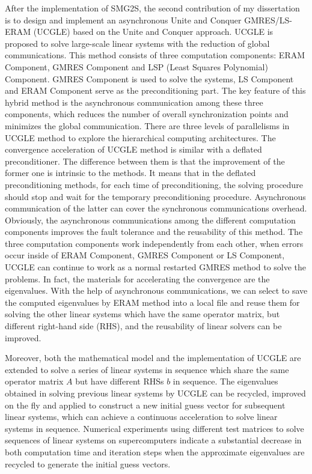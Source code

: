 After the implementation of SMG2S, the second contribution of my dissertation is to design and implement an asynchronous Unite and Conquer GMRES/LS-ERAM (UCGLE) based on the Unite and Conquer approach. UCGLE is proposed to solve large-scale linear systems with the reduction of global communications. This method consists of three computation components: ERAM Component, GMRES Component and LSP (Least Squares Polynomial) Component. GMRES Component is used to solve the systems, LS Component and ERAM Component serve as the preconditioning part. The key feature of this hybrid method is the asynchronous communication among these three components, which reduces the number of overall synchronization points and minimizes the global communication. There are three levels of parallelisms in UCGLE method to explore the hierarchical computing architectures. The convergence acceleration of UCGLE method is similar with a deflated preconditioner. The difference between them is that the improvement of the former one is intrinsic to the methods. It means that in the deflated preconditioning methods, for each time of preconditioning, the solving procedure should stop and wait for the temporary preconditioning procedure. Asynchronous communication of the latter can cover the synchronous communications overhead. Obviously, the asynchronous communications among the different computation components improves the fault tolerance and the reusability of this method. The three computation components work independently from each other, when errors occur inside of ERAM Component, GMRES Component or LS Component, UCGLE can continue to work as a normal restarted GMRES method to solve the problems. In fact, the materials for accelerating the convergence are the eigenvalues. With the help of asynchronous communications, we can select to save the computed eigenvalues by ERAM method into a local file and reuse them for solving the other linear systems which have the same operator matrix, but different right-hand side (RHS), and the reusability of linear solvers can be improved.

Moreover, both the mathematical model and the implementation of UCGLE are extended to solve a series of linear systems in sequence which share the same operator matrix $A$ but have different RHSs $b$ in sequence. The eigenvalues obtained in solving previous linear systems by UCGLE can be recycled, improved on the fly and applied to construct a new initial guess vector for subsequent linear systems, which can achieve a continuous acceleration to solve linear systems in sequence. Numerical experiments using different test matrices to solve sequences of linear systems on supercomputers indicate a substantial decrease in both computation time and iteration steps when the approximate eigenvalues are recycled to generate the initial guess vectors.

